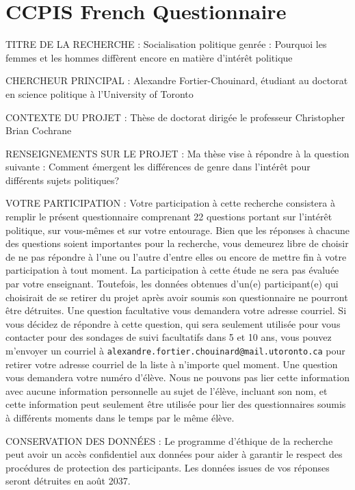 \documentclass[
  letterpaper,
  DIV=11,
  numbers=noendperiod]{scrreprt}
\begin{document}
\chapter{CCPIS French Questionnaire}\label{sec-appendix2}

TITRE DE LA RECHERCHE : Socialisation politique genrée : Pourquoi les
femmes et les hommes diffèrent encore en matière d'intérêt politique

CHERCHEUR PRINCIPAL : Alexandre Fortier-Chouinard, étudiant au doctorat
en science politique à l'University of Toronto

CONTEXTE DU PROJET : Thèse de doctorat dirigée le professeur Christopher
Brian Cochrane

RENSEIGNEMENTS SUR LE PROJET : Ma thèse vise à répondre à la question
suivante : Comment émergent les différences de genre dans l'intérêt pour
différents sujets politiques?

VOTRE PARTICIPATION : Votre participation à cette recherche consistera à
remplir le présent questionnaire comprenant 22 questions portant sur
l'intérêt politique, sur vous-mêmes et sur votre entourage. Bien que les
réponses à chacune des questions soient importantes pour la recherche,
vous demeurez libre de choisir de ne pas répondre à l'une ou l'autre
d'entre elles ou encore de mettre fin à votre participation à tout
moment. La participation à cette étude ne sera pas évaluée par votre
enseignant. Toutefois, les données obtenues d'un(e) participant(e) qui
choisirait de se retirer du projet après avoir soumis son questionnaire
ne pourront être détruites. Une question facultative vous demandera
votre adresse courriel. Si vous décidez de répondre à cette question,
qui sera seulement utilisée pour vous contacter pour des sondages de
suivi facultatifs dans 5 et 10 ans, vous pouvez m'envoyer un courriel à
\texttt{alexandre.fortier.chouinard@mail.utoronto.ca} pour retirer votre
adresse courriel de la liste à n'importe quel moment. Une question vous
demandera votre numéro d'élève. Nous ne pouvons pas lier cette
information avec aucune information personnelle au sujet de l'élève,
incluant son nom, et cette information peut seulement être utilisée pour
lier des questionnaires soumis à différents moments dans le temps par le
même élève.

CONSERVATION DES DONNÉES : Le programme d'éthique de la recherche peut
avoir un accès confidentiel aux données pour aider à garantir le respect
des procédures de protection des participants. Les données issues de vos
réponses seront détruites en août 2037.
\end{document}
